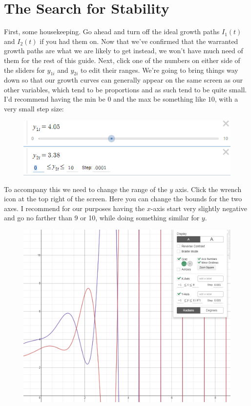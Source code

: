 \documentclass{article}
\theoremstyle{theorem}
\begin{document}
\section{The Search for Stability}
First, some housekeeping. Go ahead and turn off the ideal growth paths $I_1(t)$ and $I_2(t)$ if you had them on. Now that we've confirmed that the warranted growth paths are what we are likely to get instead, we won't have much need of them for the rest of this guide. Next, click one of the numbers on either side of the sliders for $y_{1i}$ and $y_{2i}$ to edit their ranges. We're going to bring things way down so that our growth curves can generally appear on the same screen as our other variables, which tend to be proportions and as such tend to be quite small. I'd recommend having the min be $0$ and the max be something like $10$, with a very small step size:
\begin{figure}[H]
\centering
\includegraphics[scale=0.7]{Images/bringingItDOwn}
\end{figure}
 To accompany this we need to change the range of the $y$ axis. Click the wrench icon at the top right of the screen. Here you can change the bounds for the two axes. I recommend for our purposes having the $x$-axis start very slightly negative and go no farther than 9 or 10, while doing something similar for $y$. 
\begin{figure}[H]
\centering
\includegraphics[scale=0.5]{Images/wrench}
\end{figure}
\end{document}
